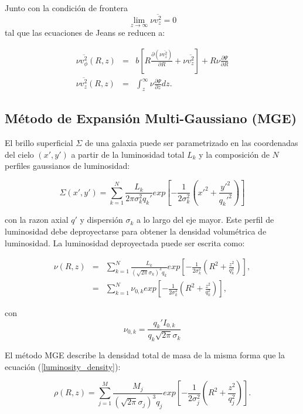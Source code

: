 Junto con la condición de frontera 
$$ \lim_{z\to\infty} \nu \overline{v_z^2} = 0 $$
tal que las ecuaciones de Jeans se reducen a:

\begin{eqnarray}
\label{Jeans_equation_phi}
\nu \overline{v_{\phi}^2}(R,z) &=& b \left [ R
\frac{\partial ( \nu \overline{v_z^2})}{\partial R} + \nu \overline{v_{z}^2} \right ] + R\nu \frac{\partial \Psi}{\partial R} \\
\label{Jeans_equation_z}
\nu \overline{v_z^2}(R,z)  &=& \int_z^{\infty} \nu \frac{\partial \Psi}{\partial z} dz.
\end{eqnarray}

\subsection{Método de Expansión Multi-Gaussiano (MGE)}

El brillo superficial $\Sigma$ de una galaxia puede ser parametrizado en las coordenadas del cielo $(x', y')$ a partir de la luminosidad total $L_k$ y la composición de $N$ perfiles gaussianos de luminosidad:

\begin{equation}
\label{surface_bright_cart}
\Sigma(x', y') = \sum_{k=1}^{N} \frac{L_k}{2\pi \sigma_k^2 q_k'} exp \left[ -\frac{1}{2\sigma_k^2} \left( x'^2 + \frac{y'^2}{q_k'^2} \right) \right ]
\end{equation}

con la razon axial $q'$ y dispersión $\sigma_k$ a lo largo del eje mayor. Este perfil de luminosidad debe deproyectarse para obtener la densidad volumétrica de luminosidad. La luminosidad deproyectada puede ser escrita como:

\begin{eqnarray}
\label{luminosity_density}
\nu (R,z) &=& \sum_{k=1}^{N} \frac{L_k}{(\sqrt{2\pi} \sigma_k)^3 q_k} exp \left[ -\frac{1}{2\sigma_k^2} \left( R^2 + \frac{z^2}{q_k^2} \right) \right ], \\
   &=& \sum_{k=1}^{N} \nu_{0,k} exp \left[ -\frac{1}{2\sigma_k^2} \left( R^2 + \frac{z^2}{q_k^2} \right) \right ],
\end{eqnarray}

con $$ \nu_{0,k} = \frac{ q_k' I_{0, k} }{ q_k \sqrt{2\pi} \sigma_k } $$



El método MGE describe la densidad total de masa de la misma forma que la ecuación (\ref{luminosity_density}):

\begin{equation}
\label{mass_density}
\rho (R,z) = \sum_{j=1}^{M} \frac{M_j}{(\sqrt{2\pi} \sigma_j)^3 q_j} exp \left[ -\frac{1}{2\sigma_j^2} \left( R^2 + \frac{z^2}{q_j^2} \right) \right ].
\end{equation}

